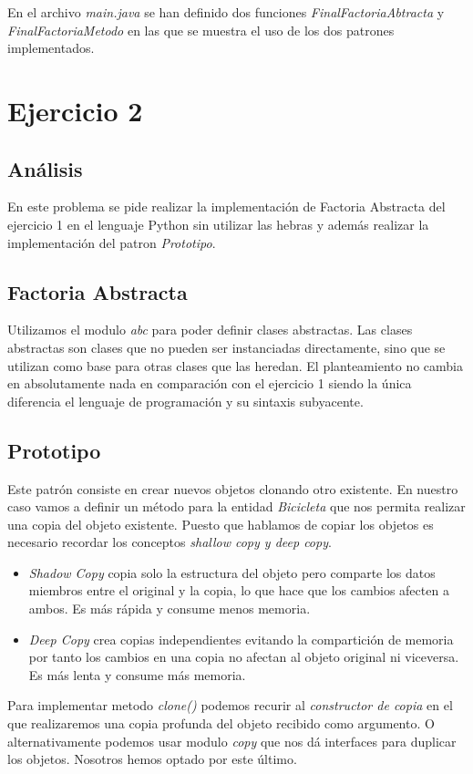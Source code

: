 \documentclass{article}
\begin{document}
En el archivo \textit{main.java} se han definido dos funciones \textit{FinalFactoriaAbtracta} y \textit{FinalFactoriaMetodo}
en las que se muestra el uso de los dos patrones implementados. 	


\section{Ejercicio 2}
\subsection{Análisis}
En este problema se pide realizar la implementación de Factoria Abstracta del ejercicio 1 en el lenguaje Python sin utilizar las hebras y además realizar la implementación del patron \textit{Prototipo}. 

\subsection{Factoria Abstracta}
Utilizamos el modulo \textit{abc} para poder definir clases abstractas. Las clases abstractas son clases que no pueden ser instanciadas directamente, sino que se utilizan como base para otras clases que las heredan. 
El planteamiento no cambia en absolutamente nada en comparación con el ejercicio 1 siendo la única diferencia el lenguaje de programación y su sintaxis subyacente.

\subsection{Prototipo}
Este patrón consiste en crear nuevos objetos clonando otro existente. En nuestro caso vamos a definir un método para la entidad \textit{Bicicleta} que nos permita realizar una copia del objeto existente. Puesto que hablamos de copiar los objetos es necesario recordar los conceptos \textit{shallow copy y deep copy}. 

\begin{itemize}
	\item \textit{Shadow Copy}  copia solo la estructura  del objeto pero comparte los datos miembros entre el original y la copia, lo que hace que los cambios afecten a ambos. Es más rápida y consume menos memoria.
	
	\item \textit{Deep Copy }crea copias independientes evitando la compartición de memoria por tanto los cambios en una copia no afectan al objeto original ni viceversa. Es más lenta y consume más memoria.
\end{itemize}

Para implementar metodo \textit{clone()} podemos recurir al \textit{constructor de copia} en el que realizaremos una copia profunda del objeto recibido como argumento. O alternativamente podemos usar modulo \textit{copy} que nos dá interfaces para duplicar los objetos. Nosotros hemos optado por este último.
\end{document}
